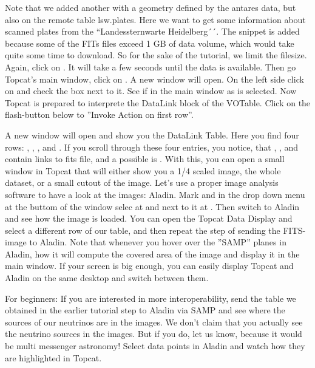 \documentclass[twoside]{article}[12pt]
\begin{document}
Note that we added another  with a geometry defined by the
antares data, but also on the remote table lsw.plates. Here we want to
get some information about scanned plates from the ``Landessternwarte
Heidelberg´´. The snippet  is added
because some of the FITs files exceed 1 GB of data volume, which would
take quite some time to download. So for the sake of the tutorial, we
limit the filesize. Again, click on . It will take a few
seconds until the data is available. 
Then go Topcat's main window, click on \goto
{}. A new window will open. On the left side
click on  and check the box next to it. See if in
the main window as   is selected.
Now Topcat is prepared to interprete the DataLink block of the VOTable.
Click on the flash-button below to ''Invoke Action on first row''.

\DATALINK


A new window will open and show you the DataLink Table. Here you find
four rows: ,  ,  , and
. 
If you scroll through these four entries, you notice, that  , 
, and
 contain links to fits file, and a possible 
is . With this, you can open a small
window in Topcat that will either show you a 1/4 scaled image, the whole
dataset, or a small cutout of the image. 
Let's use a
proper image analysis software to have a look at the images: Aladin.
Mark  and in the drop down menu at the buttom of the
window selec at   and next to it at
 . Then switch to Aladin and see how
the image is loaded. You can open the Topcat Data Display and select a
different row of our table, and then repeat the step of sending the
FITS-image to Aladin. Note that whenever you hover over the ''SAMP''
planes in Aladin, how it will compute the covered area of the image and
display it in the main window. If your screen is big enough, you can
easily display Topcat and Aladin on the same desktop and switch between
them. 

\begin{exercise}
For beginners: If you are interested in more interoperability, send the table we
obtained in the earlier tutorial step to Aladin via SAMP and see where
the sources of our neutrinos are in the images. We don't claim that you
actually see the neutrino sources in the images. But if you do, let us
know, because it would be multi messenger astronomy!
Select data points in Aladin and watch how they are highlighted in
Topcat. 
\end{exercise}
 
\end{document}
